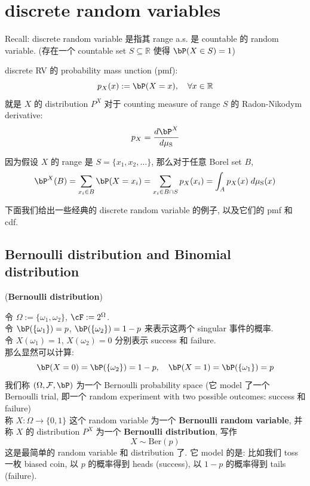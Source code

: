 \section{discrete random variables}
Recall: discrete random variable 是指其 range a.s. 是 countable 的 random variable.
(存在一个 countable set \(S \subseteq \mathbb{R}\) 
     使得 \(\bP(X \in S) = 1\))

discrete RV 的 probability mass unction (pmf):
        \[
        p_X(x) := \bP(X = x), \quad \forall x \in \mathbb{R}
        \]
就是 \(X\) 的 distribution \(P^X\) 对于 counting measure of range \(S\)
的 Radon-Nikodym derivative:
     \[
     p_X = \frac{d\bP^X}{d\mu_{\text{S}}}
     \]

因为假设 \(X\) 的 range 是 \(S = \{x_1, x_2, \ldots\}\), 
    那么对于任意 Borel set \(B\),
    \[
    \bP^X(B) = \sum_{x_i \in B} \bP(X = x_i) = \sum_{x_i \in B\cap S} p_X(x_i) = 
    \int_A p_X(x) \;d\mu_{\text{S}}(x)
     \]     



下面我们给出一些经典的 discrete random variable 的例子, 以及它们的 pmf 和 cdf.

\subsection{Bernoulli distribution and Binomial distribution}
\begin{example}{(\textbf{Bernoulli distribution})}
    
    令 \(\Omega:= \{\omega_1, \omega_2\}\), \(\cF := 2^{\Omega}\).\\
    令 \(\bP(\{\omega_1\}) = p\), \(\bP(\{\omega_2\}) = 1-p\) 来表示这两个 singular 事件的概率.\\
    令 \(X(\omega_1) = 1\), \(X(\omega_2) = 0\) 分别表示 success 和 failure.\\
    那么显然可以计算:
    \[
    \bP(X=0) = \bP(\{\omega_2\}) = 1-p, \quad \bP(X=1) = \bP(\{\omega_1\}) = p
    \]
    我们称 \((\Omega, \mathcal{F}, \bP)\) 为一个 Bernoulli probability space 
    (它 model 了一个 Bernoulli trial, 即一个 random experiment with two possible outcomes: success 和 failure)\\
    称 \(X: \Omega \to \{0,1\}\) 这个 random variable 为一个 \textbf{Bernoulli random variable},
    并称 \(X\) 的 distribution \(P^X\) 为一个 \textbf{Bernoulli distribution}, 写作
    \[
    X \sim \text{Ber}(p)
    \]
    这是最简单的 random variable 和 distribution 了. 它 model 的是: 
    比如我们 toss 一枚 biased coin, 
    以 \(p\) 的概率得到 heads (success), 
    以 \(1-p\) 的概率得到 tails (failure).\\
\end{example}

